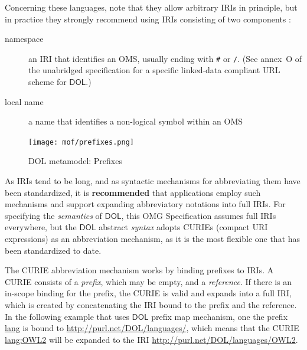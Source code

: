 \documentclass[10pt, a4paper]{isov2}
\newcommand*{\syntax}[1]{\texttt{#1}}
\newcommand*{\recommended}{\textbf{recommended}\xspace}
\newcommand*{\IS}{OMG Specification\xspace}
\newcommand*{\DOL}{\ensuremath{\mathsf{DOL}}\xspace}
\begin{document}
Concerning these languages, note that they allow arbitrary IRIs in principle, but in practice they
strongly recommend using IRIs consisting of two components \cite{W3C:swbp-vocab-pub}:
\begin{description}
\item[namespace] an IRI that identifies an OMS,
usually ending with \syntax{\#} or \syntax{/}. ({See annex~O of the unabridged specification for a specific linked-data compliant URL scheme for \DOL.})
\item[local name] a name that identifies a non-logical symbol within an OMS
\end{description}

\medskip
\begin{figure}
  \centering
    \texttt{[image: mof/prefixes.png]}
  \caption{DOL metamodel: Prefixes}
  \label{fig:prefixes}
\end{figure}


\label{c:curies}

As IRIs tend to be long, and as syntactic mechanisms for abbreviating them have been standardized,
it is \recommended that applications employ such mechanisms and support expanding abbreviatory
notations into full IRIs.  For specifying the \emph{semantics} of \DOL, this \IS assumes full IRIs
everywhere, but the \DOL abstract \emph{syntax} adopts CURIEs (compact URI expressions) as an
abbreviation mechanism, as it is the most flexible one that has been standardized to date.

The CURIE abbreviation mechanism works by binding prefixes to IRIs.  A CURIE consists of a
\emph{prefix}, which may be empty, and a \emph{reference}.  If there is an in-scope binding for the
prefix, the CURIE is valid and expands into a full IRI, which is created by concatenating the IRI
bound to the prefix and the reference.  In the following example that uses \DOL prefix map mechanism, one the prefix \url{lang} is bound to \url{http://purl.net/DOL/languages/}, which
means that the CURIE \url{lang:OWL2} will be expanded to the IRI
\url{http://purl.net/DOL/languages/OWL2}.
\end{document}
